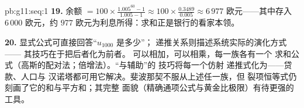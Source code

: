 \begin{solution}{pb:g11:seq:1}
\textbf{19.} 余额 $= 100 \times \frac{1.005^{60} - 1}
{1.005 - 1} \approx 100 \times \frac{0.3489}{0.005} \approx
6\,977$ 欧元——其中存入 $6\,000$ 欧元，约 $977$
欧元为利息所得：求和正是银行的看家本领。

\textbf{20.} 显式公式可直接回答“$u_{1000}$ 是多少”；
递推关系则描述系统实际的演化方式——
其技巧在于把后者化为前者。
可以相加，可以相乘，每一族各有一个
求和公式（高斯的配对法；倍增法）。“与辅助”的
技巧将每一个仿射
递推式化为——贷款、人口与
汉诺塔都可用它解决。斐波那契不服从上述任一族，但
裂项恒等式仍刻画了它的和与平方和；其完整
面貌（精确通项公式与黄金比极限）有待更强的
工具。
\end{solution}
